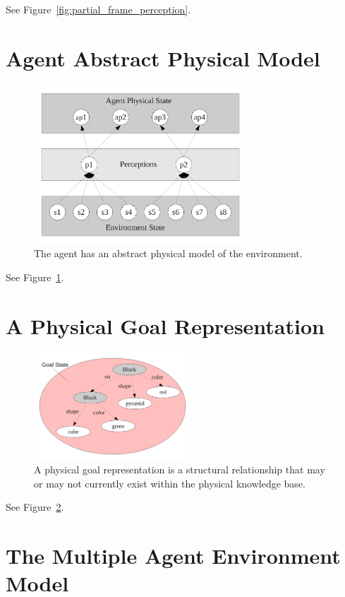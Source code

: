 See Figure~\ref{fig:partial_frame_perception}.


\section{Agent Abstract Physical Model}

\begin{figure}[bth]
  \center
  \includegraphics[width=8cm]{gfx/environment_perception_physical}
  \caption[The agent has an abstract physical model of the environment.]{The agent has an abstract physical model of the environment.}
  \label{fig:environment_perception_physical}
\end{figure}

See Figure~\ref{fig:environment_perception_physical}.


\section{A Physical Goal Representation}

\begin{figure}[bth]
  \center
  \includegraphics[height=4cm]{gfx/goal_state}
  \caption[A physical goal representation]{A physical goal representation is a structural relationship that may or may not currently exist within the physical knowledge base.}
  \label{fig:goal_state}
\end{figure}

See Figure~\ref{fig:goal_state}.


\section{The Multiple Agent Environment Model}

